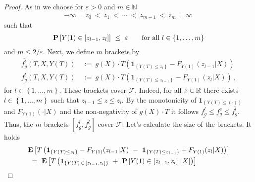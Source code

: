 \begin{proof}
  As in \cite[Example~19.6]{Vaart2000}
  we choose for
  $\varepsilon>0$ and $m\in\mathbb{N}$
  \begin{gather}
  -\infty=z_0\ <\ z_1\ <\ \cdots\ <\ z_{m-1}\ <\ z_m=\infty
  \,
  \end{gather}
  such that
  \begin{gather}
    \label{size_z}
    \P
    \left[ 
      Y(1)\in \left[ z_{l-1},z_l \right]
    \right]
    \ 
    \le
    \ 
    \varepsilon
    \qquad
    \text{for all}\ 
    l\in \left\{ 1,\ldots,m \right\}
  \end{gather}
  and $m \le 2/\varepsilon$.
  Next, we define $m$ brackets by
\begin{align*}
  \overline{f_g^l}
  (T,X,Y(T))
  &
  \ 
  :=
  \ 
      g(X)
      \cdot
      T
      \left( 
        \mathbf{1}
        _{\left\{ Y(T)\le z_{l} \right\}}
        -
        F_{Y(1)}(z_{l-1}|X)
      \right)
      \\
  \underline{f_g^l}
  (T,X,Y(T))
  &
  \ 
  :=
  \ 
      g(X)
      \cdot
      T
      \left( 
        \mathbf{1}
        _{\left\{ Y(T)\le z_{l-1} \right\}}
        -
        F_{Y(1)}(z_l|X)
      \right)
      \,,
\end{align*}
for $l\in \left\{ 1,\ldots,m \right\}$.
These brackets cover $\mathcal{F}$.
Indeed,
for all $z\in\mathbb{R}$ there exists
$l\in \left\{ 1,\ldots,m \right\}$ such that 
$z_{l-1}\le z\le z_l$.
By the monotonicity of 
$
        \mathbf{1}
      _{\left\{ Y(T)\le (\cdot) \right\}}
$
and
$
        F_{Y(1)}(\cdot|X)
$
and the non-negativity of $g(X)\cdot T$ it follows
$
  \underline{f_g^l}
  \le
  f_g^z
  \le
  \overline{f_g^l}
$. 
Thus, the $m$ brackets 
$
[
  \underline{f_g^l}
  ,
  \overline{f_g^l}
]
$
cover $\mathcal{F}$.
Let's calculate the size of the brackets.
It holds
\begin{align*}
  &
\E
\left[ 
      T
      \left( 
        \mathbf{1}
        _{\left\{ Y(T)\le z_{l} \right\}}
        -
        F_{Y(1)}(z_{l-1}|X)
        \ 
        -
        \ 
        \mathbf{1}
        _{\left\{ Y(T)\le z_{l-1} \right\}}
        +
        F_{Y(1)}(z_{l}|X)
      \right)
\right]
\\
  &
  \ 
=
  \ 
\E
\left[ 
      T
      \left( 
        \mathbf{1}
        _{\left\{
        Y(T)
        \,
        \in 
        \,
    [z_{l-1},z_l]
\right\}}
\ 
        +
\ 
        \P
        \left[ 
          Y(1)
          \in
    [z_{l-1},z_l]
        \,
    |
        \,
    X
        \right]
      \right)
\right]
\\

\end{align*}
\end{proof}
